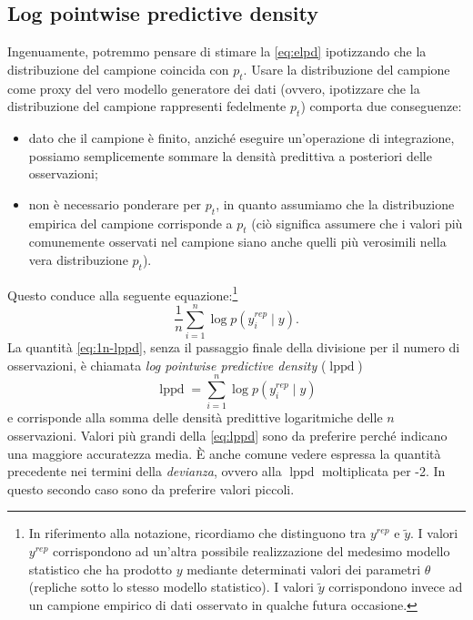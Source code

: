 \documentclass[
  10pt,
  italian,
  a4paper,
  extrafontsizes,onecolumn,openright
  ]{memoir}
\providecommand{\tightlist}{%
  \setlength{\itemsep}{0pt}\setlength{\parskip}{0pt}}
\DeclareMathOperator{\lppd}{lppd} %
\theoremstyle{definition}
\theoremstyle{definition}
\theoremstyle{definition}
\theoremstyle{definition}
\theoremstyle{remark}
\begin{document}
\hypertarget{log-pointwise-predictive-density}{%
\subsection{Log pointwise predictive density}\label{log-pointwise-predictive-density}}

Ingenuamente, potremmo pensare di stimare la \eqref{eq:elpd} ipotizzando che la distribuzione del campione coincida con \(p_t\). Usare la distribuzione del campione come proxy del vero modello generatore dei dati (ovvero, ipotizzare che la distribuzione del campione rappresenti fedelmente \(p_t\)) comporta due conseguenze:

\begin{itemize}
\tightlist
\item
  dato che il campione è finito, anziché eseguire un'operazione di integrazione, possiamo semplicemente sommare la densità predittiva a posteriori delle osservazioni;
\item
  non è necessario ponderare per \(p_t\), in quanto assumiamo che la distribuzione empirica del campione corrisponde a \(p_t\) (ciò significa assumere che i valori più comunemente osservati nel campione siano anche quelli più verosimili nella vera distribuzione \(p_t\)).
\end{itemize}

Questo conduce alla seguente equazione:\footnote{In riferimento alla notazione, ricordiamo che \textcite{gelman2014understanding} distinguono tra \(y^{rep}\) e \(\tilde{y}\). I valori \(y^{rep}\) corrispondono ad un'altra possibile realizzazione del medesimo modello statistico che ha prodotto \(y\) mediante determinati valori dei parametri \(\theta\) (repliche sotto lo stesso modello statistico). I valori \(\tilde{y}\) corrispondono invece ad un campione empirico di dati osservato in qualche futura occasione.}
\begin{equation}
\frac{1}{n} \sum_{i=1}^n \log p(y_i^{rep} \mid y).
\label{eq:1n-lppd}
\end{equation}
La quantità \eqref{eq:1n-lppd}, senza il passaggio finale della divisione per il numero di osservazioni, è chiamata \emph{log pointwise predictive density} (\(\lppd\))
\begin{equation}
\lppd = \sum_{i=1}^n \log p(y_i^{rep} \mid y)
\label{eq:lppd}
\end{equation}
e corrisponde alla somma delle densità predittive logaritmiche delle \(n\) osservazioni. Valori più grandi della \eqref{eq:lppd} sono da preferire perché indicano una maggiore accuratezza media. È anche comune vedere espressa la quantità precedente nei termini della \emph{devianza}, ovvero alla \(\lppd\) moltiplicata per -2. In questo secondo caso sono da preferire valori piccoli.
\end{document}

